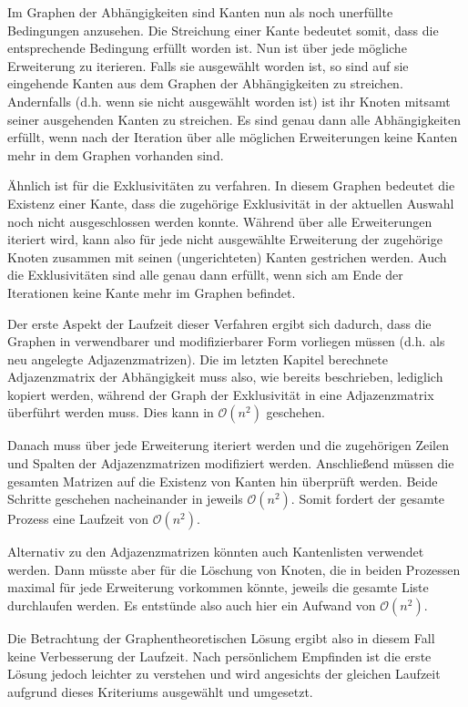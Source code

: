 Im Graphen der Abhängigkeiten sind Kanten nun als noch unerfüllte Bedingungen anzusehen. Die Streichung einer Kante bedeutet somit, dass die entsprechende Bedingung erfüllt worden ist. Nun ist über jede mögliche Erweiterung zu iterieren. Falls sie ausgewählt worden ist, so sind auf sie eingehende Kanten aus dem Graphen der Abhängigkeiten zu streichen. Andernfalls (d.h. wenn sie nicht ausgewählt worden ist) ist ihr Knoten mitsamt seiner ausgehenden Kanten zu streichen. Es sind genau dann alle Abhängigkeiten erfüllt, wenn nach der Iteration über alle möglichen Erweiterungen keine Kanten mehr in dem Graphen vorhanden sind.

Ähnlich ist für die Exklusivitäten zu verfahren. In diesem Graphen bedeutet die Existenz einer Kante, dass die zugehörige Exklusivität in der aktuellen Auswahl noch nicht ausgeschlossen werden konnte. Während über alle Erweiterungen iteriert wird, kann also für jede nicht ausgewählte Erweiterung der zugehörige Knoten zusammen mit seinen (ungerichteten) Kanten gestrichen werden. Auch die Exklusivitäten sind alle genau dann erfüllt, wenn sich am Ende der Iterationen keine Kante mehr im Graphen befindet.

Der erste Aspekt der Laufzeit dieser Verfahren ergibt sich dadurch, dass die Graphen in verwendbarer und modifizierbarer Form vorliegen müssen (d.h. als neu angelegte Adjazenzmatrizen). Die im letzten Kapitel berechnete Adjazenzmatrix der Abhängigkeit muss also, wie bereits beschrieben, lediglich kopiert werden, während der Graph der Exklusivität in eine Adjazenzmatrix überführt werden muss. Dies kann in $\mathcal{O}(n^2)$ geschehen.

Danach muss über jede Erweiterung iteriert werden und die zugehörigen Zeilen und Spalten der Adjazenzmatrizen modifiziert werden. Anschließend müssen die gesamten Matrizen auf die Existenz von Kanten hin überprüft werden. Beide Schritte geschehen nacheinander in jeweils $\mathcal{O}(n^2)$. Somit fordert der gesamte Prozess eine Laufzeit von $\mathcal{O}(n^2)$.

Alternativ zu den Adjazenzmatrizen könnten auch Kantenlisten verwendet werden. Dann müsste aber für die Löschung von Knoten, die in beiden Prozessen maximal für jede Erweiterung vorkommen könnte, jeweils die gesamte Liste durchlaufen werden. Es entstünde also auch hier ein Aufwand von $\mathcal{O}(n^2)$.

Die Betrachtung der Graphentheoretischen Lösung ergibt also in diesem Fall keine Verbesserung der Laufzeit. Nach persönlichem Empfinden ist die erste Lösung jedoch leichter zu verstehen und wird angesichts der gleichen Laufzeit aufgrund dieses Kriteriums ausgewählt und umgesetzt.


